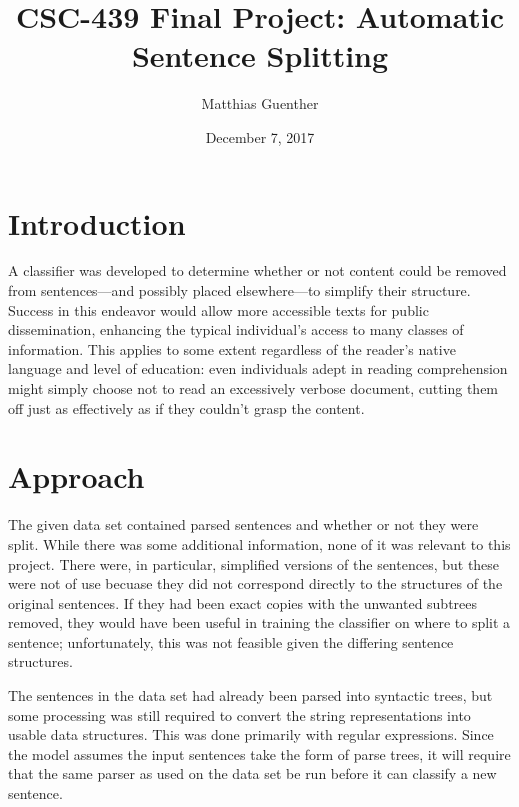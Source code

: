 \documentclass{article}
\begin{document}
\title{CSC-439 Final Project: Automatic Sentence Splitting}
\date{December 7, 2017}
\author{Matthias Guenther}
\maketitle



\section*{Introduction}

A classifier was developed to determine whether or not content could be removed from sentences---and possibly placed elsewhere---to simplify their structure. Success in this endeavor would allow more accessible texts for public dissemination, enhancing the typical individual's access to many classes of information. This applies to some extent regardless of the reader's native language and level of education: even individuals adept in reading comprehension might simply choose not to read an excessively verbose document, cutting them off just as effectively as if they couldn't grasp the content.



\section*{Approach}

The given data set contained parsed sentences and whether or not they were split. While there was some additional information, none of it was relevant to this project. There were, in particular, simplified versions of the sentences, but these were not of use becuase they did not correspond directly to the structures of the original sentences. If they had been exact copies with the unwanted subtrees removed, they would have been useful in training the classifier on where to split a sentence; unfortunately, this was not feasible given the differing sentence structures.

The sentences in the data set had already been parsed into syntactic trees, but some processing was still required to convert the string representations into usable data structures. This was done primarily with regular expressions. Since the model assumes the input sentences take the form of parse trees, it will require that the same parser as used on the data set be run before it can classify a new sentence.
\end{document}
